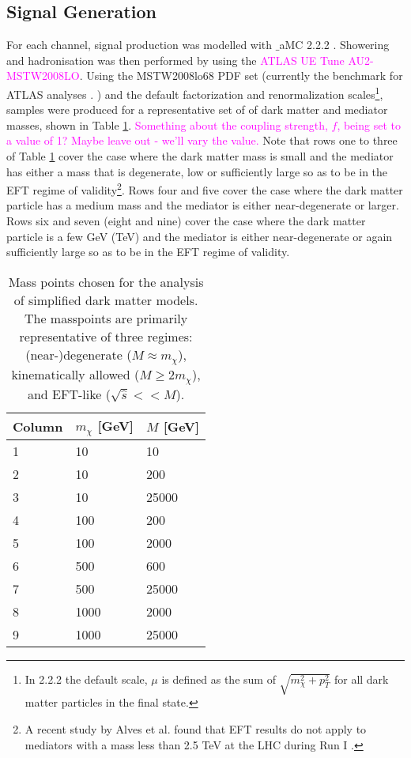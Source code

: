 \subsection{Signal Generation}
\label{signal_generation}
\begin{flushleft}

For each channel, signal production was modelled with $\_$aMC 2.2.2 . Showering and hadronisation was then performed by  using the \textcolor{magenta}{ATLAS UE Tune AU2-MSTW2008LO}. Using the MSTW2008lo68 PDF set (currently the benchmark for ATLAS analyses \cite{}. ) and the default \MG factorization and renormalization scales\footnote{In  2.2.2 the default scale, $\mu$ is defined as the sum of $\sqrt{m_{\chi}^{2} + p_{T}^{2}}$ for all dark matter particles in the final state.}, samples were produced for a representative set of of dark matter and mediator masses, shown in Table \ref{Mass_coup_points}. \textcolor{magenta}{Something about the coupling strength, $f$, being set to a value of 1? Maybe leave out - we'll vary the value.} Note that rows one to three of Table \ref{Mass_coup_points} cover the case where the dark matter mass is small and the mediator has either a mass that is degenerate, low or sufficiently large so as to be in the EFT regime of validity\footnote{A recent study by Alves et al. found that EFT results do not apply to mediators with a mass less than 2.5 TeV at the LHC during Run I \cite{Alves:2011wf}.}. Rows four and five cover the case where the dark matter particle has a medium mass and the mediator is either near-degenerate or larger. Rows six and seven (eight and nine) cover the case where the dark matter particle is a few GeV (TeV) and the mediator is either near-degenerate or again sufficiently large so as to be in the EFT regime of validity.

\begin{table}[!htbp]
\centering
\begin{tabular}{l|l|l}
\hline
\hline
 \rule{0pt}{2.2ex}Column & $m_{\chi}$ [GeV] & $M$ [GeV]\\
\hline
 \rule{0pt}{2.2ex}1 & 10 & 10\\
 2 & 10 & 200\\
 3 & 10 & 25000\\
 4 & 100 & 200\\
 5 & 100 & 2000\\
 6 & 500 & 600\\
 7 & 500 & 25000\\
 8 & 1000 & 2000\\
 9 & 1000 & 25000\\
 \hline
 \hline
\end{tabular}
\caption{Mass points chosen for the analysis of simplified dark matter models. The masspoints are primarily representative of three regimes: (near-)degenerate ($M\approx m_{\chi}$), kinematically allowed ($M \geq 2m_{\chi}$), and EFT-like ($\sqrt{\hat{s}} << M$).}
\label{Mass_coup_points}
\end{table}
\end{flushleft}

